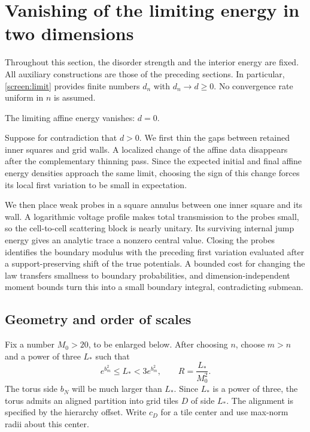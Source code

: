 \section{Vanishing of the limiting energy in two dimensions}
\label{sec:vanishing}

Throughout this section, the disorder strength and the interior energy are
fixed. All auxiliary constructions are those of the preceding sections.
In particular, \cref{screen:limit} provides finite numbers $d_n$ with
$d_n\to d\geq0$. No convergence rate uniform in $n$ is assumed.

\begin{proposition}\label{van:zero}
The limiting affine energy vanishes: $d=0$.
\end{proposition}

Suppose for contradiction that $d>0$. We first thin the gaps between
retained inner squares and grid walls. A localized change of the affine
data disappears after the complementary thinning pass. Since the
expected initial and final affine energy densities approach the same limit,
choosing the sign of this change forces its local first variation to be
small in expectation.

We then place weak probes in a square annulus between one inner square
and its wall. A logarithmic voltage profile makes total transmission to
the probes small, so the cell-to-cell scattering block is nearly
unitary. Its surviving internal jump energy gives an analytic trace a
nonzero central value. Closing the probes identifies the boundary
modulus with the preceding first variation evaluated after a
support-preserving shift of the true potentials. A bounded cost for
changing the law transfers smallness to boundary probabilities, and
dimension-independent moment bounds turn this into a small boundary
integral, contradicting submean.

\subsection{Geometry and order of scales}

Fix a number $M_0>20$, to be enlarged below. After choosing $n$, choose
$m>n$ and a power of three $L_*$ such that
\begin{equation}\label{van:scales}
 e^{b_m^2}\leq L_*<3e^{b_m^2},
 \qquad R=\frac{L_*}{M_0^2}.
\end{equation}
The torus side $b_N$ will be much larger than $L_*$. Since $L_*$ is a
power of three, the torus admits an aligned partition into grid tiles
$D$ of side $L_*$. The alignment is specified by the hierarchy offset.
Write $c_D$ for a tile center and use max-norm radii about this center.

